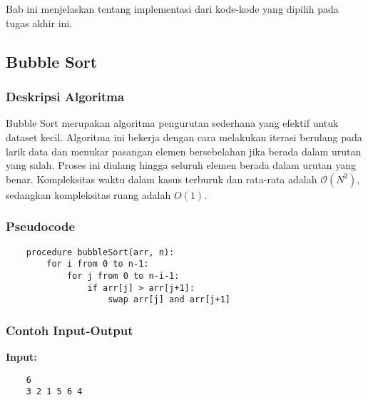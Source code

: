 \chapter{\babEmpat}
\label{bab:4}
Bab ini menjelaskan tentang implementasi dari kode-kode yang dipilih pada tugas akhir ini.



\section{Bubble Sort}
\label{sec:bubble-sort-implementation}
\subsection{Deskripsi Algoritma}
Bubble Sort merupakan algoritma pengurutan sederhana yang efektif untuk dataset kecil. Algoritma ini bekerja dengan cara melakukan iterasi berulang pada larik data dan menukar pasangan elemen bersebelahan jika berada dalam urutan yang salah. Proses ini diulang hingga seluruh elemen berada dalam urutan yang benar. Kompleksitas waktu dalam kasus terburuk dan rata-rata adalah $\mathcal{O}\left(N^2\right)$, sedangkan kompleksitas ruang adalah ${O}\left(1\right)$.

\subsection{Pseudocode}
\begin{verbatim}
    procedure bubbleSort(arr, n):
        for i from 0 to n-1:
            for j from 0 to n-i-1:
                if arr[j] > arr[j+1]:
                    swap arr[j] and arr[j+1]
\end{verbatim}

\subsection{Contoh Input-Output}
\textbf{Input:}
\begin{verbatim}
    6
    3 2 1 5 6 4
\end{verbatim}

